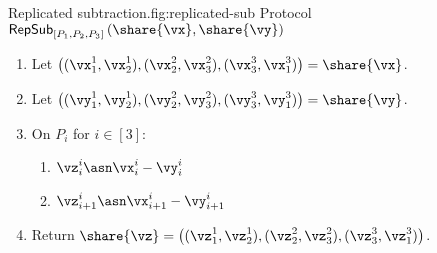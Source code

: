 \begin{Boxfig}{Replicated subtraction.}{fig:replicated-sub}
  {Protocol $\mathsf{RepSub}_{[P_1, P_2, P_3]}\left(\share{\vx}, \share{\vy} \right)$}
  
  \begin{enumerate}
  \item Let $\left( (\vx_1^1, \vx_2^1), (\vx_2^2, \vx_3^2), (\vx_3^3, \vx_1^3) \right) = \share{\vx}$.
  
  \item Let $\left( (\vy_1^1, \vy_2^1), (\vy_2^2, \vy_3^2), (\vy_3^3, \vy_1^3) \right) = \share{\vy}$.
  
  \item On $P_i$ for $i \in [3]$:
  \begin{enumerate}
    \item $\vz_i^i \asn \vx_i^i - \vy_i^i$
    \item $\vz_{i+1}^i \asn \vx_{i+1}^i - \vy_{i+1}^i$
  \end{enumerate}
  
  \item Return $\share{\vz} = \left( (\vz_1^1, \vz_2^1), (\vz_2^2, \vz_3^2), (\vz_3^3, \vz_1^3) \right)$.
  \end{enumerate}
\end{Boxfig}
